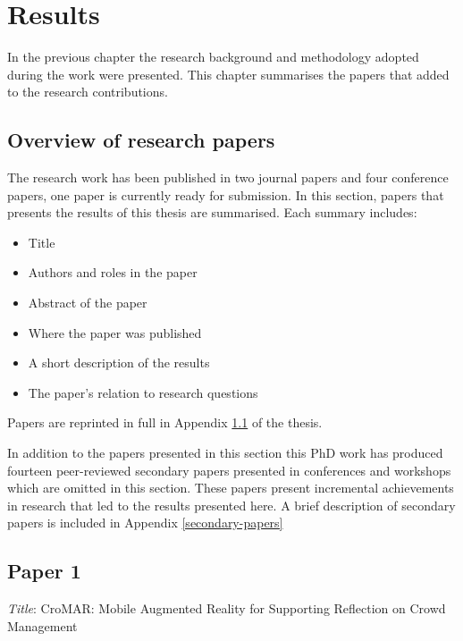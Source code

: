 \chapter{Results}\label{results}


In the previous chapter the research background and methodology adopted during the work were presented. This chapter summarises the papers that added to the research contributions.

\section{Overview of research papers}\label{papers}

The research work has been published in two journal papers and four conference papers, one paper is currently ready for submission. In this section, papers that presents the results of this thesis are summarised. Each summary includes: 
\begin{itemize}
	\itemsep1pt\parskip0pt 
	\item Title 
	\item Authors and roles in the paper 
	\item Abstract of the paper
	\item Where the paper was published 
	\item A short description of the results 
	\item The paper's relation to research questions 
\end{itemize}

Papers are reprinted in full in Appendix \ref{papers} of the thesis.

In addition to the papers presented in this section this PhD work has produced fourteen peer-reviewed secondary papers presented in conferences and workshops which are omitted in this section. These papers present incremental achievements in research that led to the results presented here. A brief description of secondary papers is included in Appendix \ref{secondary-papers}

\section[P1: CroMAR: Mobile Augmented Reality for Supporting Reflection on Crowd Management]{Paper 1} \label{paper-1}

\emph{Title}: CroMAR: Mobile Augmented Reality for Supporting Reflection on Crowd Management

